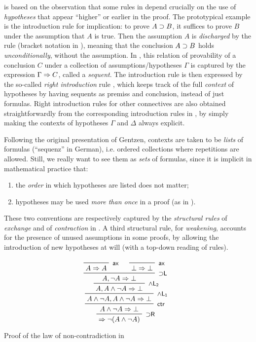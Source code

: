  is based on the observation that some rules in  depend crucially on the use of \emph{hypotheses} that appear
``higher'' or earlier in the proof. The prototypical example is the introduction
rule  for implication: to prove $A \supset B$, it suffices to prove
$B$ under the assumption that $A$ is true. Then the assumption $A$ is
\emph{discharged} by the rule (bracket notation in ), meaning
that the conclusion $A \supset B$ holds \emph{unconditionally}, without the
assumption. In , this relation of provability of a conclusion
$C$ under a collection of assumptions/hypotheses $\Gamma$ is captured by the
expression $\Gamma \Rightarrow C$, called a \emph{sequent}. The introduction rule
 is then expressed by the so-called \emph{right introduction} rule
, which keeps track of the full \emph{context} of hypotheses by
having sequents as premiss and conclusion, instead of just formulas. Right
introduction rules for other connectives are also obtained straightforwardly
from the corresponding introduction rules in , by simply
making the contexts of hypotheses $\Gamma$ and $\Delta$ always explicit.

Following the original presentation of Gentzen, contexts are taken to be
\emph{lists} of formulas (``sequenz'' in German), i.e. ordered collections where
repetitions are allowed. Still, we really want to see them as \emph{sets} of
formulas, since it is implicit in mathematical practice that:
\begin{enumerate}
\item the \emph{order} in which hypotheses are listed does not matter;
\item hypotheses may be used \emph{more than once} in a proof (as in
).
\end{enumerate}
These two conventions are respectively captured by the \emph{structural rules}
 of \emph{exchange} and  of \emph{contraction} in
. A third structural rule,  for \emph{weakening},
accounts for the presence of unused assumptions in some proofs, by allowing the
introduction of new hypotheses at will (with a top-down reading of rules).

\begin{marginfigure}
  $$
  \R[\rsf{{\limp} R}]
  {\R[\rsf{ctr}]
  {\R[\rsf{\land L_1}]
  {\R[\rsf{\land L_2}]
  {\R[\rsf{{\limp} L}]
    {\R[\rsf{ax}]
    {A \seq A}}
    {\R[\rsf{ax}]
    {\bot \seq \bot}}
    {A, \neg A \seq \bot}}
  {A, A \land \neg A \seq \bot}}
  {A \land \neg A, A \land \neg A \seq \bot}}
  {A \land \neg A \seq \bot}}
  {\seq \neg (A \land \neg A)}
  $$
  \caption{Proof of the law of non-contradiction in }
\end{marginfigure}

